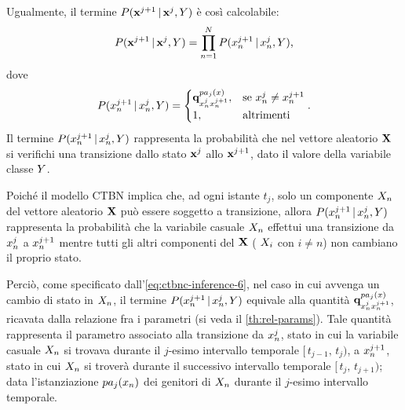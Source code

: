 Ugualmente, il termine $P(\mathbf{x}^{j+1}\,\arrowvert\,\mathbf{x}^j,\mathnormal{Y})$ è così calcolabile:
\begin{equation}\label{eq:ctbnc-inference-5}
P(\mathbf{x}^{j+1}\,\arrowvert\,\mathbf{x}^j,\mathnormal{Y})=\prod_{n=1}^N P(\mathnormal{x}_n^{j+1}\,\arrowvert\,\mathnormal{x}_n^j,\mathnormal{Y})\text{,}
\end{equation}
dove
\begin{equation}\label{eq:ctbnc-inference-6}
P(\mathnormal{x}_n^{j+1}\,\arrowvert\,\mathnormal{x}_n^j,\mathnormal{Y})=
\begin{cases}
\boldsymbol{\textbf{\text{q}}}_{\mathnormal{x}_n^j\mathnormal{x}_n^{j+1}}^{pa_j(\mathnormal{x})}, & \text{se } \mathnormal{x}_n^j \neq \mathnormal{x}_n^{j+1} \\
1, & \text{altrimenti}
\end{cases}\text{.}
\end{equation}
Il termine $P(\mathnormal{x}_n^{j+1}\,\arrowvert\,\mathnormal{x}_n^j,\mathnormal{Y})$ rappresenta la probabilità che nel vettore aleatorio $\mathbf{X}$ si verifichi una transizione dallo stato $\mathbf{x}^j$ allo $\mathbf{x}^{j+1}$, dato il valore della variabile classe $\mathnormal{Y}$.

Poiché il modello \acs{CTBN} implica che, ad ogni istante $t_j$, solo un componente $\mathnormal{X}_n$ del vettore aleatorio $\mathbf{X}$ può essere soggetto a transizione, allora $P(\mathnormal{x}_n^{j+1}\,\arrowvert\,\mathnormal{x}_n^j,\mathnormal{Y})$ rappresenta la probabilità che la variabile casuale $\mathnormal{X}_n$ effettui una transizione da $\mathnormal{x}_n^j$ a $\mathnormal{x}_n^{j+1}$ mentre tutti gli altri componenti del  $\mathbf{X}$ (\ie{} $\mathnormal{X}_i$ con $i \neq n$) non cambiano il proprio stato.

Perciò, come specificato dall'\autoref{eq:ctbnc-inference-6}, nel caso in cui avvenga un cambio di stato in $\mathnormal{X}_n$, il termine $P(\mathnormal{x}_n^{j+1}\,\arrowvert\,\mathnormal{x}_n^j,\mathnormal{Y})$ equivale alla quantità $\boldsymbol{\textbf{\text{q}}}_{\mathnormal{x}_n^j\mathnormal{x}_n^{j+1}}^{pa_j(\mathnormal{x})}$, ricavata dalla relazione fra i parametri (si veda il \autoref{th:rel-params}). Tale quantità rappresenta il parametro associato alla transizione da $\mathnormal{x}_n^j$, stato in cui la variabile casuale $\mathnormal{X}_n$ si trovava durante il $j$-esimo intervallo temporale $[\,t_{j-1},\,t_j)$, a $\mathnormal{x}_n^{j+1}$, stato in cui $\mathnormal{X}_n$ si troverà durante il successivo intervallo temporale $[\,t_j,\,t_{j+1})$; data l'istanziazione $pa_j(\mathnormal{x}_n)$ dei genitori di $\mathnormal{X}_n$ durante il $j$-esimo intervallo temporale.

